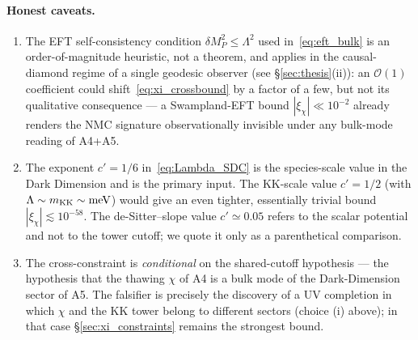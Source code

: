 \paragraph{Honest caveats.}
\begin{enumerate}
\item The EFT self-consistency condition $\delta M_P^{2}\le\Lambda^{2}$
  used in~\eqref{eq:eft_bulk} is an order-of-magnitude heuristic, not a
  theorem, and applies in the causal-diamond regime of a single geodesic
  observer (see \S\ref{sec:thesis}(ii)): an $\mathcal{O}(1)$ coefficient could shift~\eqref{eq:xi_crossbound}
  by a factor of a few, but not its qualitative consequence --- a
  Swampland-EFT bound $|\xi_\chi|\ll 10^{-2}$ already renders the NMC
  signature observationally invisible under any bulk-mode reading of A4+A5.
\item The exponent $c'=1/6$ in~\eqref{eq:Lambda_SDC} is the species-scale
  value in the Dark Dimension and is the primary input. The KK-scale value
  $c'=1/2$ (with $\Lambda\sim m_{\rm KK}\sim\mathrm{meV}$) would give an
  even tighter, essentially trivial bound $|\xi_\chi|\lesssim 10^{-58}$.
  The de-Sitter--slope value $c'\simeq 0.05$ refers to the scalar potential
  and not to the tower cutoff; we quote it only as a parenthetical
  comparison.
\item The cross-constraint is \emph{conditional} on the shared-cutoff
  hypothesis --- the hypothesis that the thawing $\chi$ of A4 is a bulk
  mode of the Dark-Dimension sector of A5. The falsifier is precisely the
  discovery of a UV completion in which $\chi$ and the KK tower belong to
  different sectors (choice (i) above); in that case
  \S\ref{sec:xi_constraints} remains the strongest bound.
\end{enumerate}

%   
